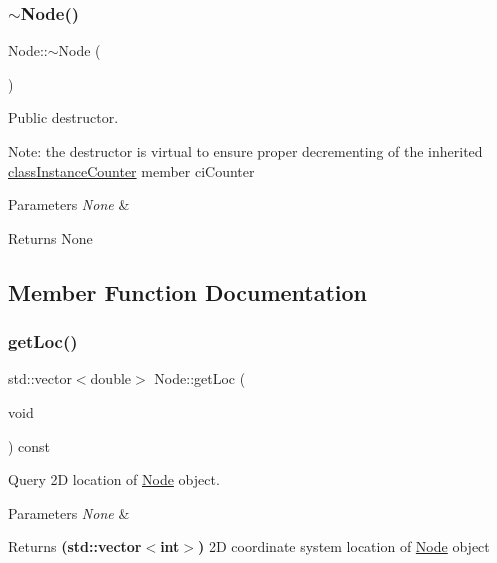 \subsubsection{\texorpdfstring{$\sim$\+Node()}{~Node()}}
{\footnotesize\ttfamily Node\+::$\sim$\+Node (\begin{DoxyParamCaption}{ }\end{DoxyParamCaption})\hspace{0.3cm}{\ttfamily [virtual]}}



Public destructor. 

Note\+: the destructor is virtual to ensure proper decrementing of the inherited \mbox{\hyperlink{classclass_instance_counter}{class\+Instance\+Counter}} member ci\+Counter 
\begin{DoxyParams}{Parameters}
{\em None} & \\
\hline
\end{DoxyParams}
\begin{DoxyReturn}{Returns}
None 
\end{DoxyReturn}


\subsection{Member Function Documentation}
\mbox{\label{class_node_ae59cc8d62b6cfa623252b98341c3084c}} 
\subsubsection{\texorpdfstring{get\+Loc()}{getLoc()}}
{\footnotesize\ttfamily std\+::vector$<$double$>$ Node\+::get\+Loc (\begin{DoxyParamCaption}\item[{void}]{ }\end{DoxyParamCaption}) const\hspace{0.3cm}{\ttfamily [inline]}}



Query 2D location of \mbox{\hyperlink{class_node}{Node}} object. 


\begin{DoxyParams}{Parameters}
{\em None} & \\
\hline
\end{DoxyParams}
\begin{DoxyReturn}{Returns}
{\bfseries (std\+::vector$<$int$>$)} 2D coordinate system location of \mbox{\hyperlink{class_node}{Node}} object 
\end{DoxyReturn}
\mbox{\label{class_node_aeda47a1decedb8fc3835579d75b7d65f}} 
